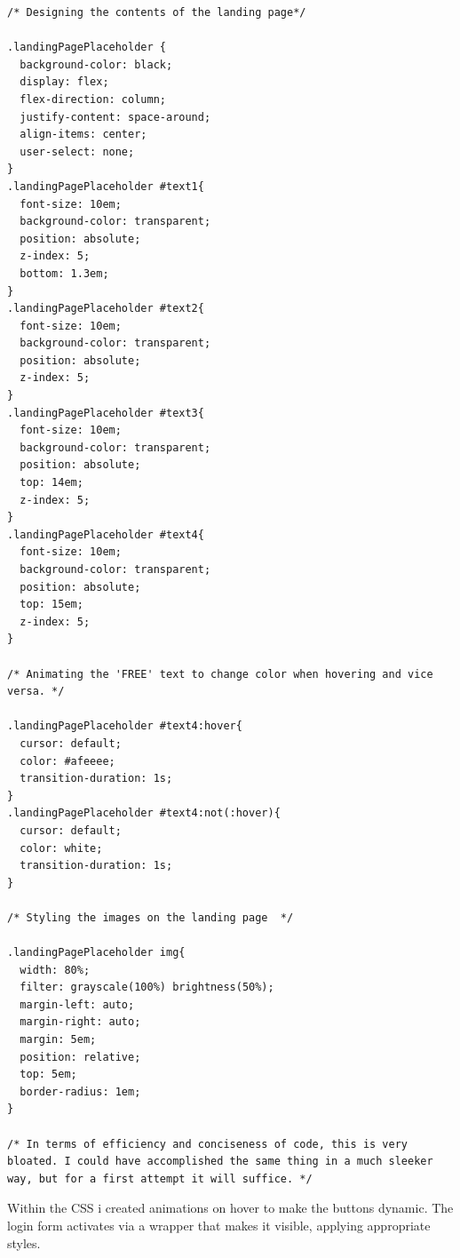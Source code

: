 \documentclass{article}
\begin{document}
\begin{lstlisting}[caption={landingpage.css}]
/* Designing the contents of the landing page*/

.landingPagePlaceholder {
  background-color: black;
  display: flex;
  flex-direction: column;
  justify-content: space-around;
  align-items: center;
  user-select: none;
}
.landingPagePlaceholder #text1{
  font-size: 10em;
  background-color: transparent;
  position: absolute;
  z-index: 5;
  bottom: 1.3em;
}
.landingPagePlaceholder #text2{
  font-size: 10em;
  background-color: transparent;
  position: absolute;
  z-index: 5;
}
.landingPagePlaceholder #text3{
  font-size: 10em;
  background-color: transparent;
  position: absolute;
  top: 14em;
  z-index: 5;
}
.landingPagePlaceholder #text4{
  font-size: 10em;
  background-color: transparent;
  position: absolute;
  top: 15em;
  z-index: 5;
}

/* Animating the 'FREE' text to change color when hovering and vice versa. */

.landingPagePlaceholder #text4:hover{
  cursor: default;
  color: #afeeee;
  transition-duration: 1s;
}
.landingPagePlaceholder #text4:not(:hover){
  cursor: default;
  color: white;
  transition-duration: 1s;
}

/* Styling the images on the landing page  */

.landingPagePlaceholder img{
  width: 80%;
  filter: grayscale(100%) brightness(50%);
  margin-left: auto;
  margin-right: auto;
  margin: 5em;
  position: relative;
  top: 5em;
  border-radius: 1em;
}

/* In terms of efficiency and conciseness of code, this is very bloated. I could have accomplished the same thing in a much sleeker way, but for a first attempt it will suffice. */
\end{lstlisting}

Within the CSS i created animations on hover to make the buttons dynamic. The login form activates via a wrapper that makes it visible, applying appropriate styles. 
\end{document}
